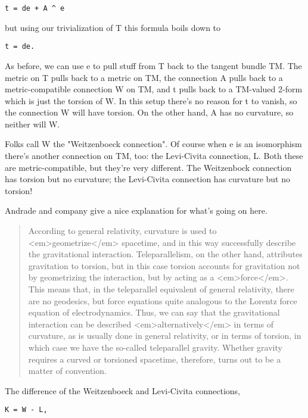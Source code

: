 \begin{verbatim}
t = de + A ^ e
\end{verbatim}
    
but using our trivialization of T this formula boils down to

\begin{verbatim}
t = de.
\end{verbatim}
    
As before, we can use e to pull stuff from T back to the tangent bundle
TM.  The metric on T pulls back to a metric on TM, the connection A
pulls back to a metric-compatible connection W on TM, and t pulls back
to a TM-valued 2-form which is just the torsion of W.  In this setup
there's no reason for t to vanish, so the connection W will have
torsion.  On the other hand, A has no curvature, so neither will W.

Folks call W the "Weitzenboeck connection".  Of course when e is an
isomorphism there's another connection on TM, too: the Levi-Civita
connection, L.  Both these are metric-compatible, but they're very
different.  The Weitzenbock connection has torsion but no curvature; 
the Levi-Civita connection has curvature but no torsion!  

Andrade and company give a nice explanation for what's going on here.

\begin{quote}
According to general relativity, curvature is used to <em>geometrize</em>
spacetime, and in this way successfully describe the gravitational 
interaction.  Teleparallelism, on the other hand, attributes gravitation 
to torsion, but in this case torsion accounts for gravitation not
by geometrizing the interaction, but by acting as a <em>force</em>.  This
means that, in the teleparallel equivalent of general relativity,
there are no geodesics, but force equations quite analogous to the 
Lorentz force equation of electrodynamics.  Thus, we can say that the 
gravitational interaction can be described <em>alternatively</em> in terms 
of curvature, as is usually done in general relativity, or in 
terms of torsion, in which case we have the so-called teleparallel 
gravity.  Whether gravity requires a curved or torsioned spacetime, 
therefore, turns out to be a matter of convention.
\end{quote}
    
The difference of the Weitzenboeck and Levi-Civita connections,

\begin{verbatim}
K = W - L,
\end{verbatim}
    

